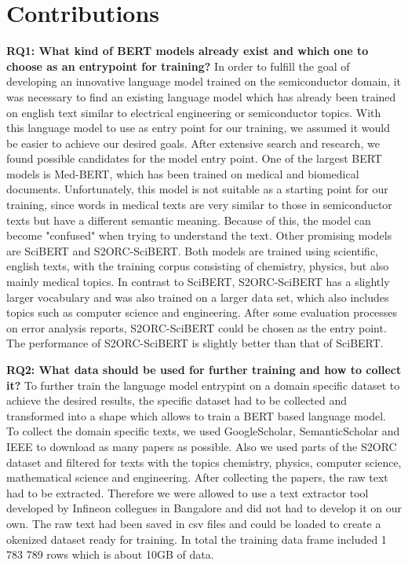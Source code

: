 \section{Contributions}
\textbf{RQ1: What kind of BERT models already exist and which one to choose as an entrypoint for training?} \newline
In order to fulfill the goal of developing an innovative language model trained on the semiconductor domain, it was necessary to find an existing language model which has already been trained on english text similar to electrical engineering or semiconductor topics. With this language model to use as entry point for our training, we assumed it would be easier to achieve our desired goals. \newline
After extensive search and research, we found possible candidates for the model entry point. One of the largest BERT models is Med-BERT, which has been trained on medical and biomedical documents. Unfortunately, this model is not suitable as a starting point for our training, since words in medical texts are very similar to those in semiconductor texts but have a different semantic meaning. Because of this, the model can become "confused" when trying to understand the text. Other promising models are SciBERT and S2ORC-SciBERT. Both models are trained using scientific, english texts, with the training corpus consisting of chemistry, physics, but also mainly medical topics. In contrast to SciBERT, S2ORC-SciBERT has a slightly larger vocabulary and was also trained on a larger data set, which also includes topics such as computer science and engineering. \newline
After some evaluation processes on error analysis reports, S2ORC-SciBERT could be chosen as the entry point. The performance of S2ORC-SciBERT is slightly better than that of SciBERT.

\textbf{RQ2: What data should be used for further training and how to collect it?} \newline
To further train the language model entrypint on a domain specific dataset to achieve the desired results, the specific dataset had to be collected and transformed into a shape which allows to train a BERT based language model. To collect the domain specific texts, we used \alert{GoogleScholar, SemanticScholar and IEEE} to download as many papers as possible. Also we used parts of the S2ORC dataset and filtered for texts with the topics chemistry, physics, computer science, mathematical science and engineering. After collecting the papers, the raw text had to be extracted. Therefore we were allowed to use a text extractor tool developed by Infineon collegues in\alert{ Bangalore} and did not had to develop it on our own. The raw text had been saved in csv files and could be loaded to create a okenized dataset ready for training. In total the training data frame included 1 783 789 rows which is about 10GB of data.



